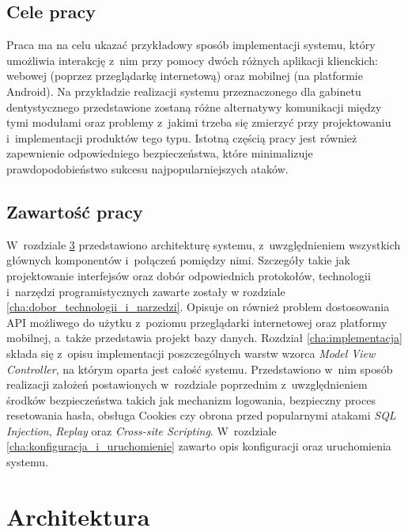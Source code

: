 \documentclass[11pt]{aghdpl}
\begin{document}
\section{Cele pracy}
\label{sec:cele_pracy}

Praca ma na celu ukazać przykładowy sposób implementacji systemu, który umożliwia interakcję z~nim przy pomocy dwóch różnych aplikacji klienckich: webowej (poprzez przeglądarkę internetową) oraz mobilnej (na platformie Android). Na przykładzie realizacji systemu przeznaczonego dla gabinetu dentystycznego przedstawione zostaną różne alternatywy komunikacji między tymi modułami oraz problemy z~jakimi trzeba się zmierzyć przy projektowaniu i~implementacji produktów tego typu. Istotną częścią pracy jest również zapewnienie odpowiedniego bezpieczeństwa, które minimalizuje prawdopodobieństwo sukcesu najpopularniejszych ataków.

\section{Zawartość pracy}
\label{sec:zawartosc_pracy}

W~rozdziale \ref{cha:architektura} przedstawiono architekturę systemu, z~uwzględnieniem wszystkich głównych komponentów i~połączeń pomiędzy nimi. Szczegóły takie jak projektowanie interfejsów oraz dobór odpowiednich protokołów, technologii i~narzędzi programistycznych zawarte zostały w rozdziale \ref{cha:dobor_technologii_i_narzedzi}. Opisuje on również problem dostosowania API możliwego do użytku z~poziomu przeglądarki internetowej oraz platformy mobilnej, a~także przedstawia projekt bazy danych. Rozdział \ref{cha:implementacja} składa się z~opisu implementacji poszczególnych warstw wzorca \emph{Model View Controller}, na którym oparta jest całość systemu. Przedstawiono w~nim sposób realizacji założeń postawionych w~rozdziale poprzednim z~uwzględnieniem środków bezpieczeństwa takich jak mechanizm logowania, bezpieczny proces resetowania hasła, obsługa Cookies czy obrona przed popularnymi atakami \emph{SQL Injection}, \emph{Replay} oraz \emph{Cross-site Scripting}. W~rozdziale \ref{cha:konfiguracja_i_uruchomienie} zawarto opis konfiguracji oraz uruchomienia systemu.


\chapter{Architektura}
\label{cha:architektura}
\end{document}
